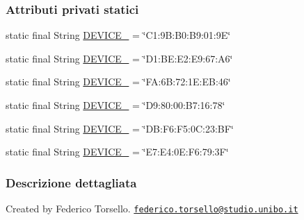 \subsubsection*{Attributi privati statici}
\begin{DoxyCompactItemize}
\item 
static final String \hyperlink{classit_1_1unibo_1_1torsello_1_1bluetoothpositioning_1_1constant_1_1DeviceConstants_a1be810cb4e758baabfa5350f2185b4e1_a1be810cb4e758baabfa5350f2185b4e1}{D\+E\+V\+I\+C\+E\+\_} = \char`\"{}C1\+:9\+B\+:\+B0\+:\+B9\+:01\+:9E\char`\"{}
\item 
static final String \hyperlink{classit_1_1unibo_1_1torsello_1_1bluetoothpositioning_1_1constant_1_1DeviceConstants_a6e71224c86695cf216855bc6c0c77a2d_a6e71224c86695cf216855bc6c0c77a2d}{D\+E\+V\+I\+C\+E\+\_} = \char`\"{}D1\+:\+B\+E\+:\+E2\+:\+E9\+:67\+:\+A6\char`\"{}
\item 
static final String \hyperlink{classit_1_1unibo_1_1torsello_1_1bluetoothpositioning_1_1constant_1_1DeviceConstants_abfaa226793391615faf49ee223f594fb_abfaa226793391615faf49ee223f594fb}{D\+E\+V\+I\+C\+E\+\_} = \char`\"{}F\+A\+:6\+B\+:72\+:1\+E\+:\+E\+B\+:46\char`\"{}
\item 
static final String \hyperlink{classit_1_1unibo_1_1torsello_1_1bluetoothpositioning_1_1constant_1_1DeviceConstants_a77b0930bc8fba094ecdbf42c91d707ea_a77b0930bc8fba094ecdbf42c91d707ea}{D\+E\+V\+I\+C\+E\+\_} = \char`\"{}D9\+:80\+:00\+:\+B7\+:16\+:78\char`\"{}
\item 
static final String \hyperlink{classit_1_1unibo_1_1torsello_1_1bluetoothpositioning_1_1constant_1_1DeviceConstants_a89c9787da5f909162555b4ff956beae4_a89c9787da5f909162555b4ff956beae4}{D\+E\+V\+I\+C\+E\+\_} = \char`\"{}D\+B\+:\+F6\+:\+F5\+:0\+C\+:23\+:\+BF\char`\"{}
\item 
static final String \hyperlink{classit_1_1unibo_1_1torsello_1_1bluetoothpositioning_1_1constant_1_1DeviceConstants_adcdd15d4bd91950603204b771d985527_adcdd15d4bd91950603204b771d985527}{D\+E\+V\+I\+C\+E\+\_} = \char`\"{}E7\+:\+E4\+:0\+E\+:\+F6\+:79\+:3F\char`\"{}
\end{DoxyCompactItemize}


\subsubsection{Descrizione dettagliata}
Created by Federico Torsello. \href{mailto:federico.torsello@studio.unibo.it}{\tt federico.\+torsello@studio.\+unibo.\+it} 

